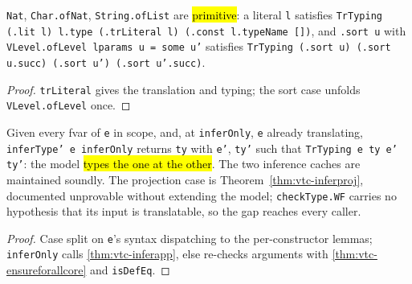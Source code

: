 \begin{lemma}
  \label{thm:vtc-infer-literal-sort}
  \leanok

   \texttt{Nat}, \texttt{Char.ofNat}, \texttt{String.ofList} are \hl{primitive}: a
  literal \texttt{l} satisfies \texttt{TrTyping (.lit l) l.type (.trLiteral l)
  (.const l.typeName [])}, and \texttt{.sort u} with \texttt{VLevel.ofLevel lparams u = some u'}
  satisfies \texttt{TrTyping (.sort u) (.sort u.succ) (.sort u') (.sort u'.succ)}.
\end{lemma}
\begin{proof}
  \leanok
   \texttt{trLiteral} gives the translation and typing; the sort case unfolds
  \texttt{VLevel.ofLevel} once.
\end{proof}

\begin{theorem}
  \label{thm:vtc-infertype-prime}
  \leanok

   Given every fvar of \texttt{e} in scope, and, at \texttt{inferOnly}, \texttt{e}
  already translating, \texttt{inferType' e inferOnly} returns \texttt{ty} with \texttt{e'},
  \texttt{ty'} such that \texttt{TrTyping e ty e' ty'}: the model \hl{types the one at the
  other}. The two inference caches are maintained soundly.
   The projection case is Theorem~\ref{thm:vtc-inferproj}, documented unprovable
  without extending the model; \texttt{checkType.WF} carries no hypothesis that its input is
  translatable, so the gap reaches every caller.
\end{theorem}
\begin{proof}
  \leanok
   Case split on \texttt{e}'s syntax dispatching to the per-constructor lemmas;
  \texttt{inferOnly} calls \ref{thm:vtc-inferapp}, else re-checks arguments with
  \ref{thm:vtc-ensureforallcore} and \texttt{isDefEq}.
\end{proof}

